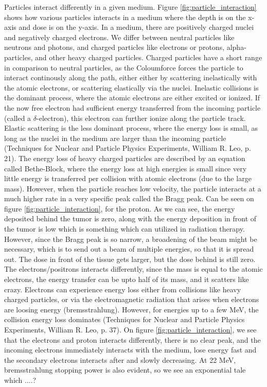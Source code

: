 \documentclass[a4paper,11pt,twoside]{book}
\begin{document}
Particles interact differently in a given medium. Figure \ref{fig:particle_interaction} shows how various particles interacts in a medium where the depth is on the x-axis and dose is on the y-axis. In a medium, there are positively charged nuclei and negatively charged electrons. We differ between neutral particles like neutrons and photons, and charged particles like electrons or protons, alpha-particles, and other heavy charged particles. Charged particles have a short range in comparison to neutral particles, as the Coloumforce forces the particle to interact continously along the path, either either by scattering inelastically with the atomic electrons, or scattering elastically via the nuclei. Inelastic collisions is the dominant process, where the atomic electrons are either excited or ionized. If the now free electron had sufficient energy transferred from the incoming particle (called a $\delta$-electron), this electron can further ionize along the particle track. Elastic scattering is the less dominant process, where the energy loss is small, as long as the nuclei in the medium are larger than the incoming particle (Techniques for Nuclear and Particle Physics Experiments, William R. Leo, p. 21). The energy loss of heavy charged particles are described by an equation called Bethe-Block, where the energy loss at high energies is small since very little energy is transferred per collision with atomic electrons (due to the large mass). However, when the particle reaches low velocity, the particle interacts at a much higher rate in a very specific peak called the Bragg peak. Can be seen on figure \ref{fig:particle_interaction}, for the proton. As we can see, the energy deposited behind the tumor is zero, along with the energy deposition in front of the tumor is low which is something which can utilized in radiation therapy. However, since the Bragg peak is so narrow, a broadening of the beam might be necessary, which is to send out a beam of multiple energies, so that it is spread out. The dose in front of the tissue gets larger, but the dose behind is still zero. The electrons/positrons interacts differently, since the mass is equal to the atomic electrons, the energy transfer can be upto half of its mass, and it scatters like crazy. Electrons can experience energy loss either from collisions like heavy charged particles, or via the electromagnetic radiation that arises when electrons are loosing energy (bremsstrahlung). However, for energies up to a few MeV, the collision energy loss dominates (Techniques for Nuclear and Particle Physics Experiments, William R. Leo, p. 37). On figure \ref{fig:particle_interaction}, we see that  the electrons and proton interacts differently, there is no clear peak, and the incoming electrons immediately interacts with the medium, lose energy fast and the secondary electrons interacts after and slowly decreasing. At 22 MeV, bremsstrahlung stopping power is also evident, so we see an exponential tale which ....? \\
\end{document}
